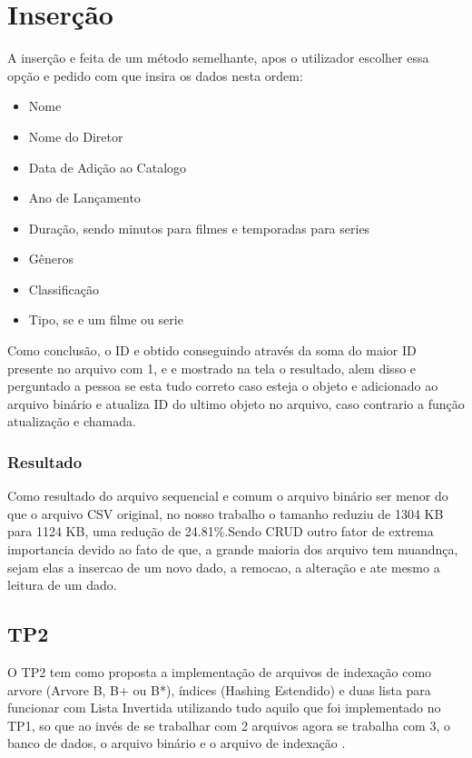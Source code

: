\documentclass[12pt]{article}
\begin{document}
\section*{Inserção}
A inserção e feita de um método semelhante, apos o utilizador escolher essa opção e pedido com que insira os dados nesta ordem:

\begin{itemize}
  \item Nome
  \item Nome do Diretor
  \item Data de Adição ao Catalogo
  \item Ano de Lançamento
  \item Duração, sendo minutos para filmes e temporadas para series
  \item Gêneros
  \item Classificação
  \item Tipo, se e um filme ou serie
\end{itemize}

Como conclusão, o ID e obtido conseguindo através da soma do maior ID presente no arquivo com 1, e e mostrado na tela o resultado, alem disso e perguntado a pessoa se esta tudo correto caso esteja o objeto e adicionado ao arquivo binário e atualiza ID do ultimo objeto no arquivo, caso contrario a função atualização e chamada.

\subsubsection{Resultado}
Como resultado do arquivo sequencial e comum o arquivo binário ser menor do que o arquivo CSV original, no nosso trabalho o tamanho reduziu de 1304 KB para 1124 KB, uma redução de 24.81\%.Sendo CRUD outro fator de extrema importancia devido ao fato de que, a grande maioria dos arquivo tem muandnça, sejam elas a insercao de um novo dado, a remocao, a alteração e ate mesmo a leitura de um dado.

\subsection{TP2}

O TP2 tem como proposta a implementação de arquivos de indexação como arvore (Arvore B, B+ ou B*), índices (Hashing Estendido) e duas lista para funcionar com Lista Invertida utilizando tudo aquilo que foi implementado no TP1, so que ao invés de se trabalhar com 2 arquivos agora se trabalha com 3, o banco de dados, o arquivo binário e o arquivo de indexação .
\end{document}
